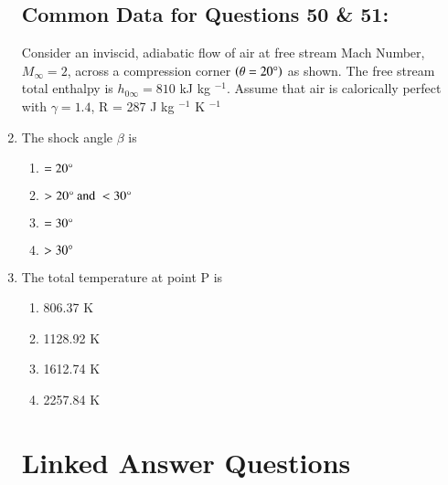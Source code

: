 \documentclass[journal]{IEEEtran}
\begin{document}
\begin{enumerate}
\subsection*{Common Data for Questions 50 \& 51:}
Consider an inviscid, adiabatic flow of air at free stream Mach Number, $M_{\infty} = 2$, across a compression corner $\left(\theta = 20 \degree\right)$ as shown. The free stream total enthalpy is $h_{0 \infty} = 810$ kJ kg $^{-1}$. Assume that air is calorically perfect with $\gamma = 1.4$, R = 287 J kg $^{-1}$ K $^{-1}$
\item The shock angle $\beta$ is
\begin{multicols}{2}
    \begin{enumerate}
        \item $=20 \degree$
        \item $>20 \degree \text{ and } <30 \degree$
        \item $ = 30 \degree$
        \item $>30 \degree$
    \end{enumerate}
\end{multicols}
\item The total temperature at point P is
\begin{multicols}{2}
    \begin{enumerate}
        \item 806.37 K
        \item 1128.92 K
        \item 1612.74 K
        \item 2257.84 K
    \end{enumerate}
\end{multicols}

\section*{Linked Answer Questions}

\end{enumerate}
\end{document}
